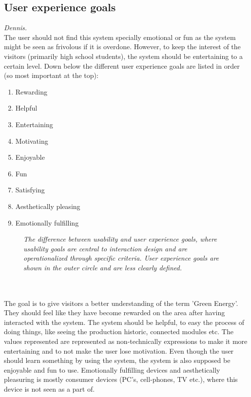 \subsection{User experience goals}\textit{Dennis.}\\
The user should not find this system specially emotional or fun as the system might be seen as frivolous if it is overdone. However, to keep the interest of the visitors (primarily high school students), the system should be entertaining to a certain level.  
Down below the different user experience goals are listed in order (so most important at the top):
\begin{enumerate}
	\item Rewarding
	\item Helpful
	\item Entertaining
	\item Motivating
	\item Enjoyable
	\item Fun
	\item Satisfying
	\item Aesthetically pleasing
	\item Emotionally fulfilling
\end{enumerate}


\begin{figure}
	\center
		\setlength\fboxsep{0pt}
		\setlength\fboxrule{0pt}
   	\caption{\textit{The difference between usability and user experience goals, where  usability goals are central to
  			interaction design and are operationalized through specific criteria. 
  			User experience goals are shown in the outer circle and are less clearly defined.}}
   	\label{fig:index_page_design}
\end{figure}
\textbf{ }\\ \\ 
The goal is to give visitors a better understanding of the term 'Green Energy'. They should feel like they have become rewarded on the area after having interacted with the system. The system should be helpful, to easy the process of doing things, like seeing the production historic, connected modules etc. The values represented are represented as non-technically expressions to make it more entertaining and to not make the user lose motivation. Even though the user should learn something by using the system, the system is also supposed be enjoyable and fun to use. Emotionally fulfilling devices and aesthetically pleasuring is mostly consumer devices (PC's, cell-phones, TV etc.), where this device is not seen as a part of.
